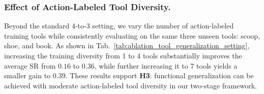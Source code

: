 \subsubsection{Effect of Action-Labeled Tool Diversity.}
\begin{table}
\vspace{-0.8em}
\centering
\captionsetup{skip=4pt}
\caption{\textbf{Ablation on Action-Labeled Tool Diversity.} Success rate (SR) of \algoname{} when the execution policy $\pi_{\mathrm{sys1}}$ is trained with action-labeled data from $M=1 \text{,} 4 \text{,} 7$ tools and consistently evaluated on the same three unseen tools: scoop, shoe, and book.}
\label{tab:ablation_tool_generalization_setting}

\vspace{-0.8em}
\end{table}
Beyond the standard 4-to-3 setting, we vary the number of action-labeled training tools while consistently evaluating on the same three unseen tools: scoop, shoe, and book.
As shown in Tab.~\ref{tab:ablation_tool_generalization_setting}, increasing the training diversity from 1 to 4 tools substantially improves the average SR from $0.16$ to $0.36$, while further increasing it to 7 tools yields a smaller gain to $0.39$.
These results support \textbf{H3}: functional generalization can be achieved with moderate action-labeled tool diversity in our two-stage framework.


